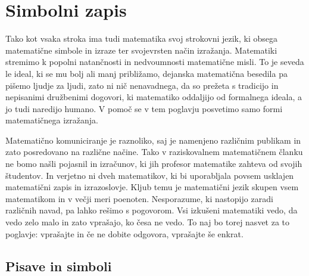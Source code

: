\chapter{Simbolni zapis}

Tako kot vsaka stroka ima tudi matematika svoj strokovni jezik, ki obsega matematične
simbole in izraze ter svojevrsten način izražanja. Matematiki stremimo k popolni
natančnosti in nedvoumnosti matematične misli. To je seveda le ideal, ki se mu bolj ali
manj približamo, dejanska matematična besedila pa pišemo ljudje za ljudi, zato ni nič
nenavadnega, da so prežeta s tradicijo in nepisanimi družbenimi dogovori, ki matematiko
oddaljijo od formalnega ideala, a jo tudi naredijo humano.
%
V pomoč se v tem poglavju posvetimo samo formi matematičnega izražanja.

Matematično komuniciranje je raznoliko, saj je namenjeno različnim publikam in zato
posredovano na različne načine. Tako v raziskovalnem matematičnem članku ne bomo našli
pojasnil in izračunov, ki jih profesor matematike zahteva od svojih študentov. In verjetno
ni dveh matematikov, ki bi uporabljala povsem usklajen matematični zapis in izrazoslovje.
Kljub temu je matematični jezik skupen vsem matematikom in v večji meri poenoten.
Nesporazume, ki nastopijo zaradi različnih navad, pa lahko rešimo s pogovorom. Vsi
izkušeni matematiki vedo, da vedo zelo malo in zato vprašajo, ko česa ne vedo. To naj bo
torej nasvet za to poglavje: vprašajte in če ne dobite odgovora, vprašajte še enkrat.







\section{Pisave in simboli}
\label{sec:pisave-in-simboli}

